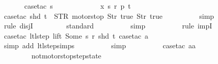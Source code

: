 \begin{isabellebody}
\isanewline
\ \ \ \ \ \isamarkupfalse%
\ {\isacharparenleft}case{\isacharunderscore}tac\ {\isachardoublequoteopen}s\ {\isasymin}\ {\isacharbraceleft}{}{\isacharcomma}\ {}{\isacharcomma}\ {}{\isacharcomma}\ {}{\isacharbraceright}{\isachardoublequoteclose}{\isacharparenright}\isanewline
\ \ \ \ \ \isamarkupfalse%
\ \ x\ s\ r\ p\ t\isanewline
\ \ \ \ \ \ \ \isamarkupfalse%
\ {\isacharparenleft}case{\isacharunderscore}tac\ {\isachardoublequoteopen}{\isacharparenleft}shd\ t{\isacharparenright}\ {\isacharequal}\ {\isacharparenleft}STR\ {\isacharprime}{\isacharprime}motorstop{\isacharprime}{\isacharprime}{\isacharcomma}\ {\isacharbrackleft}Str\ {\isacharprime}{\isacharprime}true{\isacharprime}{\isacharprime}{\isacharcomma}\ Str\ {\isacharprime}{\isacharprime}true{\isacharprime}{\isacharprime}{\isacharbrackright}{\isacharparenright}{\isachardoublequoteclose}{\isacharparenright}\isanewline
\ \ \ \ \ \ \ \ \isamarkupfalse%
\ simp\isanewline
\ \ \ \ \ \ \ \isamarkupfalse%
\ {\isacharparenleft}rule\ disjI{}{\isacharparenright}{\isacharplus}\isanewline
\ \ \ \ \ \ \ \isamarkupfalse%
\ standard\isanewline
\ \ \ \ \ \ \ \ \isamarkupfalse%
\ simp\isanewline
\ \ \ \ \ \ \ \ \isamarkupfalse%
\ {\isacharparenleft}rule\ impI{\isacharparenright}\isanewline
\ \ \ \ \ \ \ \ \isamarkupfalse%
\ {\isacharparenleft}case{\isacharunderscore}tac\ {\isachardoublequoteopen}ltl{\isacharunderscore}step\ lift\ {\isacharparenleft}Some\ s{\isacharparenright}\ r\ {\isacharparenleft}shd\ t{\isacharparenright}{\isachardoublequoteclose}{\isacharcomma}\ case{\isacharunderscore}tac\ a{\isacharparenright}\isanewline
\ \ \ \ \ \ \ \ \ \isamarkupfalse%
\ {\isacharparenleft}simp\ add{\isacharcolon}\ ltl{\isacharunderscore}step{\isachardot}simps{\isacharparenright}\isanewline
\ \ \ \ \ \ \ \ \isamarkupfalse%
\ simp\isanewline
\ \ \ \ \ \ \ \ \isamarkupfalse%
\ {\isacharparenleft}case{\isacharunderscore}tac\ {\isachardoublequoteopen}aa\ {\isasymin}\ {\isacharbraceleft}{}{\isacharcomma}\ {}{\isacharcomma}\ {}{\isacharcomma}\ {}{\isacharbraceright}{\isachardoublequoteclose}{\isacharparenright}\isanewline
\ \ \ \ \ \ \ \isamarkupfalse%
\ {}\isanewline
\ \ \ \ \ \ \ \isamarkupfalse%
\ not{\isacharunderscore}motorstop{\isacharunderscore}step{\isacharunderscore}state\ \isamarkupfalse%

\end{isabellebody}
